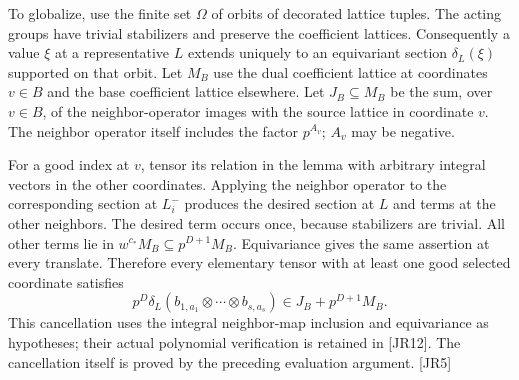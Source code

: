 To globalize, use the finite set $\Omega$ of orbits of decorated lattice tuples. The acting groups have trivial stabilizers and preserve the coefficient lattices. Consequently a value $\xi$ at a representative $L$ extends uniquely to an equivariant section $\delta_L(\xi)$ supported on that orbit. Let $M_B$ use the dual coefficient lattice at coordinates $v\in B$ and the base coefficient lattice elsewhere. Let $J_B\subseteq M_B$ be the sum, over $v\in B$, of the neighbor-operator images with the source lattice in coordinate $v$. The neighbor operator itself includes the factor $p^{A_v}$; $A_v$ may be negative.

For a good index at $v$, tensor its relation in the lemma with arbitrary integral vectors in the other coordinates. Applying the neighbor operator to the corresponding section at $L_i^-$ produces the desired section at $L$ and terms at the other neighbors. The desired term occurs once, because stabilizers are trivial. All other terms lie in $w^{c_*}M_B\subseteq p^{D+1}M_B$. Equivariance gives the same assertion at every translate. Therefore every elementary tensor with at least one good selected coordinate satisfies
\begin{equation}\label{eq:jr-one-good}
 p^D\delta_L(b_{1,a_1}\otimes\cdots\otimes b_{s,a_s})
       \in J_B+p^{D+1}M_B.
\end{equation}
This cancellation uses the integral neighbor-map inclusion and equivariance as hypotheses; their actual polynomial verification is retained in \textsf{[JR12]}. The cancellation itself is proved by the preceding evaluation argument. \textsf{[JR5]}

